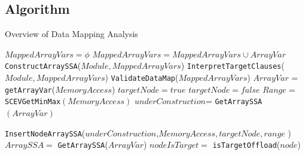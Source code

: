 \subsection{Algorithm}
\begin{algorithm}[!htbp]
    \caption{Overview of Data Mapping Analysis}
    \label{dataMapAnalysisAlgo}
    \begin{algorithmic}[1]
        \small 
        \State $MappedArrayVars=\phi$
            \State $MappedArrayVars = MappedArrayVars \cup ArrayVar$
        \EndFor
        \State \texttt{ConstructArraySSA}($Module, MappedArrayVars$)
        \State \texttt{InterpretTargetClauses}($Module, MappedArrayVars$)
        \State \texttt{ValidateDataMap}($MappedArrayVars$)
    \EndFunction
            \State $ArrayVar$ = \texttt{getArrayVar}($MemoryAccess$)
                \State $targetNode = true$
            \Else
                \State $targetNode = false$
            \EndIf
            \State $Range= $ \texttt{SCEVGetMinMax}$(MemoryAccess)$
            \State $underConstruction$= \texttt{GetArraySSA}$(ArrayVar)$
            
            \State {}
            
            \State \texttt{InsertNodeArraySSA}($underConstruction$,$MemoryAccess, targetNode, range$ )
            \State  {}            
            \EndIf 
        \EndFor
        \EndFunction
            \State $ArraySSA =$ \texttt{GetArraySSA}($ArrayVar$)
                \State $nodeIsTarget =$ \texttt{isTargetOffload}($node$)
                

\end{algorithmic}
\end{algorithm}

